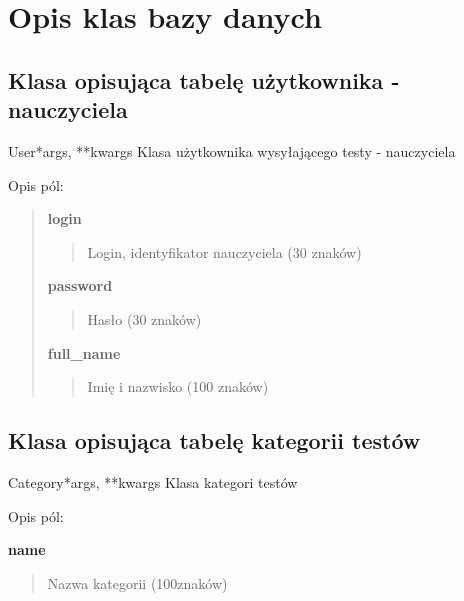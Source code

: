 \documentclass[letterpaper,10pt,polish]{manual}
\begin{document}
\chapter{Opis klas bazy danych}
\hypertarget{module-knut\_server.tests.models}{}
\modulesynopsis{}

\hypertarget{models-user}{}\section{Klasa opisująca tabelę użytkownika - nauczyciela}

\hypertarget{knut\_server.tests.models.User}{}\begin{classdesc}{User}{*args, **kwargs}
Klasa użytkownika wysyłającego testy - nauczyciela

Opis pól:
\begin{quote}

\textbf{login}
\begin{quote}

Login, identyfikator nauczyciela (30 znaków)
\end{quote}

\textbf{password}
\begin{quote}

Hasło (30 znaków)
\end{quote}

\textbf{full\_name}
\begin{quote}

Imię i nazwisko (100 znaków)
\end{quote}
\end{quote}
\end{classdesc}
\hypertarget{models-category}{}

\section{Klasa opisująca tabelę kategorii testów}

\hypertarget{knut\_server.tests.models.Category}{}\begin{classdesc}{Category}{*args, **kwargs}
Klasa kategori testów

Opis pól:

\textbf{name}
\begin{quote}

Nazwa kategorii (100znaków)
\end{quote}
\end{classdesc}
\hypertarget{models-test}{}
\end{document}
